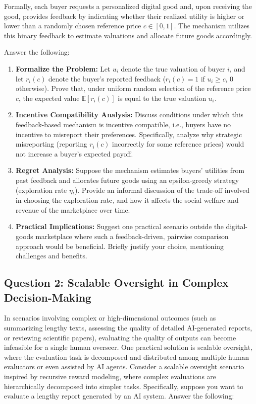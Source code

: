 \documentclass[
  letterpaper,
  numbers=noenddot,
  DIV=11]{scrreprt}
\theoremstyle{plain}
\theoremstyle{definition}
\theoremstyle{remark}
\begin{document}
Formally, each buyer requests a personalized digital good and, upon
receiving the good, provides feedback by indicating whether their
realized utility is higher or lower than a randomly chosen reference
price \(c \in [0,1]\). The mechanism utilizes this binary feedback to
estimate valuations and allocate future goods accordingly.

Answer the following:

\begin{enumerate}
\def\labelenumi{(\alph{enumi})}
\item
  \textbf{Formalize the Problem:} Let \(u_i\) denote the true valuation
  of buyer \(i\), and let \(r_i(c)\) denote the buyer's reported
  feedback (\(r_i(c) = 1\) if \(u_i \geq c\), 0 otherwise). Prove that,
  under uniform random selection of the reference price \(c\), the
  expected value \(\mathbb{E}[r_i(c)]\) is equal to the true valuation
  \(u_i\).
\item
  \textbf{Incentive Compatibility Analysis:} Discuss conditions under
  which this feedback-based mechanism is incentive compatible, i.e.,
  buyers have no incentive to misreport their preferences. Specifically,
  analyze why strategic misreporting (reporting \(r_i(c)\) incorrectly
  for some reference prices) would not increase a buyer's expected
  payoff.
\item
  \textbf{Regret Analysis:} Suppose the mechanism estimates buyers'
  utilities from past feedback and allocates future goods using an
  epsilon-greedy strategy (exploration rate \(\eta_t\)). Provide an
  informal discussion of the trade-off involved in choosing the
  exploration rate, and how it affects the social welfare and revenue of
  the marketplace over time.
\item
  \textbf{Practical Implications:} Suggest one practical scenario
  outside the digital-goods marketplace where such a feedback-driven,
  pairwise comparison approach would be beneficial. Briefly justify your
  choice, mentioning challenges and benefits.
\end{enumerate}

\subsection{Question 2: Scalable Oversight in Complex
Decision-Making}\label{question-2-scalable-oversight-in-complex-decision-making}

In scenarios involving complex or high-dimensional outcomes (such as
summarizing lengthy texts, assessing the quality of detailed
AI-generated reports, or reviewing scientific papers), evaluating the
quality of outputs can become infeasible for a single human overseer.
One practical solution is scalable oversight, where the evaluation task
is decomposed and distributed among multiple human evaluators or even
assisted by AI agents. Consider a scalable oversight scenario inspired
by recursive reward modeling, where complex evaluations are
hierarchically decomposed into simpler tasks. Specifically, suppose you
want to evaluate a lengthy report generated by an AI system. Answer the
following:
\end{document}
